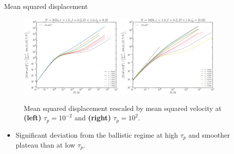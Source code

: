 \documentclass{beamer}
\begin{document}
\begin{frame}{Mean squared displacement}

\begin{figure}
\centering
\includegraphics[width=0.45\textwidth]{msdv2_No1024_Tl1000_Rn1000.eps}
\includegraphics[width=0.45\textwidth]{msdv2_No1024_Tl1000_Rj1000.eps}
\caption{Mean squared displacement rescaled by mean squared velocity at {\bf (left)} $\tau_p = 10^{-2}$ and {\bf (right)} $\tau_p = 10^2$.}
\end{figure}

\begin{itemize}
  \item Significant deviation from the ballistic regime at high $\tau_p$ and smoother plateau than at low $\tau_p$.
\end{itemize}

\end{frame}
\end{document}

